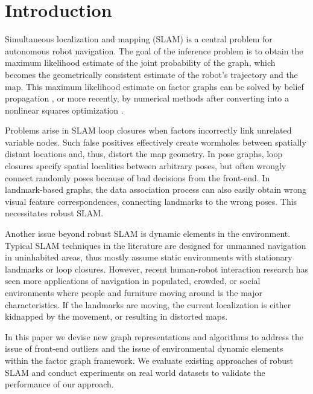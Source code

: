 \section{Introduction}
Simultaneous localization and mapping (SLAM) is a central problem for
autonomous robot navigation.  The goal of
the inference problem is to obtain the maximum likelihood estimate of the
joint probability of the graph, which becomes the geometrically consistent
estimate of the robot's trajectory and the map. This maximum likelihood estimate on factor graphs can be solved by belief propagation , or more recently, by numerical methods after converting into a nonlinear squares optimization .  

Problems arise in SLAM loop closures when factors incorrectly link unrelated variable nodes.  Such false positives effectively create wormholes between spatially distant locations and, thus, distort the map geometry. In pose graphs, loop closures specify spatial localities between arbitrary poses, but often wrongly connect randomly poses because of bad decisions from the front-end.  In landmark-based graphs, the data association process can also easily obtain wrong visual feature correspondences, connecting landmarks to the wrong poses. This necessitates robust SLAM.

Another issue beyond robust SLAM is dynamic elements in the environment.
Typical SLAM techniques in the literature are designed for unmanned navigation
in uninhabited areas, thus mostly assume static environments with stationary
landmarks or loop closures. However, recent human-robot interaction research
has seen more applications of navigation in populated, crowded, or social
environments where people and furniture moving around is the major
characteristics. If the landmarks are moving, the current localization is either
kidnapped by the movement, or resulting in distorted maps.

In this paper we devise new graph representations and algorithms to
address the issue of front-end outliers and the issue of environmental
dynamic elements within the factor graph framework. We evaluate existing
approaches of robust SLAM and conduct experiments on real world datasets to
validate the performance of our approach.
